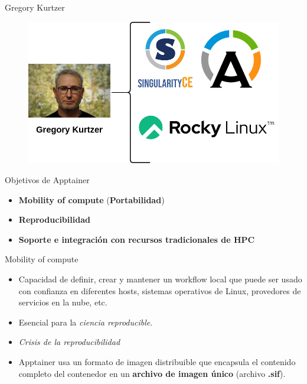 \documentclass[11pt]{beamer}
\begin{document}
\begin{frame}{Gregory Kurtzer}
  \begin{figure}
  	\includegraphics[scale=0.4]{images/kurtzer}
  \end{figure}
\end{frame}

\begin{frame}{Objetivos de Apptainer \citep{kurtzer2017singularity}}
  \begin{itemize}
  	\item \textbf{Mobility of compute} (\textbf{Portabilidad})
  	\item \textbf{Reproducibilidad}
  	\item \textbf{Soporte e integración con recursos tradicionales de HPC}
  \end{itemize}
\end{frame}


\begin{frame}{Mobility of compute}
  \begin{itemize}
  	\item Capacidad de definir, crear y mantener un workflow local que puede ser usado con confianza en diferentes hosts, sistemas operativos de Linux, provedores de servicios en la nube, etc.
  	\item Esencial para la \textit{ciencia reproducible}.
  	\item \textit{Crisis de la reproducibilidad} \citep{baker2015over, open2015estimating, fidler2013science}
  	\item Apptainer usa un formato de imagen distribuible que encapsula el contenido completo del contenedor en un \textbf{archivo de imagen único} (archivo \textbf{.sif}).

  \end{itemize}
\end{frame}
\end{document}
